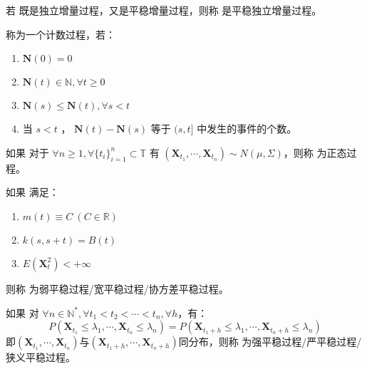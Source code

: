        \begin{definition}[平稳独立增量过程]
            若 \StochasticProcess 既是独立增量过程，又是平稳增量过程，则称 \StochasticProcess 是平稳独立增量过程。
        \end{definition}

        \begin{definition}[计数过程]
            \CountingProcess 称为一个计数过程，若：
            \begin{enumerate}[label=(\arabic*).]
                \item $\textbf{N}(0) = 0$
                \item $\textbf{N}(t) \in \mathbb{N}, \forall t \geq 0$
                \item $\textbf{N}(s) \leq \textbf{N}(t), \forall s < t$
                \item 当 $s < t$ ， $\textbf{N}(t) - \textbf{N}(s)$ 等于 $(s, t]$ 中发生的事件的个数。
            \end{enumerate}
        \end{definition}

        \begin{definition}[正态过程]
           如果 \StochasticProcess 对于 $ \forall n \geq 1, \forall \{ t_i \}_{i = 1}^{n} \subset \mathbb{T}$ 有 $\left( \textbf{X}_{t_1}, \cdots, \textbf{X}_{t_n}\right) \sim N(\mu, \Sigma)$，则称 \StochasticProcess 为正态过程。
        \end{definition}

        \begin{definition}
            如果 \StochasticProcess 满足：
            \begin{enumerate}[label=(\arabic*)]
                \item $m(t) \equiv C\ (C \in \mathbb{R})$
                \item $k(s, s+t) = B(t)$
                \item $ E\left( \textbf{X}_t^2 \right) < +\infty $
            \end{enumerate}
            则称 \StochasticProcess 为弱平稳过程/宽平稳过程/协方差平稳过程。
        \end{definition}

        \begin{definition}
            如果 \StochasticProcess 对 $\forall n \in \mathbb{N}^*, \forall t_1 < t_2 < \cdots < t_n, \forall h$，有：
            $$
            P\left( \textbf{X}_{t_1} \leq \lambda_1, \cdots, \textbf{X}_{t_n} \leq \lambda_n \right) = P\left( \textbf{X}_{t_1 + h} \leq \lambda_1, \cdots, \textbf{X}_{t_n + h} \leq \lambda_n \right)
            $$
            即$(\textbf{X}_{t_1}, \cdots, \textbf{X}_{t_n})$与$(\textbf{X}_{t_1 + h}, \cdots, \textbf{X}_{t_n + h})$同分布，则称 \StochasticProcess 为强平稳过程/严平稳过程/狭义平稳过程。
            
        \end{definition}